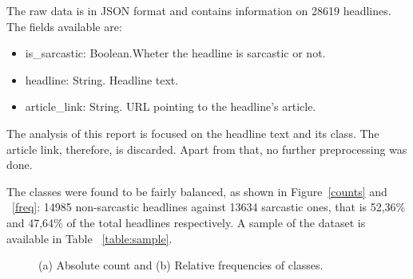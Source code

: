 The raw data is in JSON format and contains information on 28619 headlines. The fields available are:

\begin{itemize}
	\itemsep0em 
	\item{is\_sarcastic: Boolean.Wheter the headline is sarcastic or not.}
	\item{headline: String. Headline text.}
	\item{article\_link: String. URL pointing to the headline's article.}
\end{itemize}

The analysis of this report is focused on the headline text and its class. The article link, therefore, is discarded. Apart from that, no further preprocessing was done.

The classes were found to be fairly balanced, as shown in Figure~\ref{counts} and ~\ref{freq}: 14985 non-sarcastic headlines against 13634 sarcastic ones, that is 52,36\% and 47,64\% of the total headlines respectively. A sample of the dataset is available in Table ~\ref{table:sample}.

\begin{figure}[!tbp]
	\centering
	\hfill
	\label{class-balance}
	\caption{(a) Absolute count and (b) Relative frequencies of classes.}
\end{figure}

